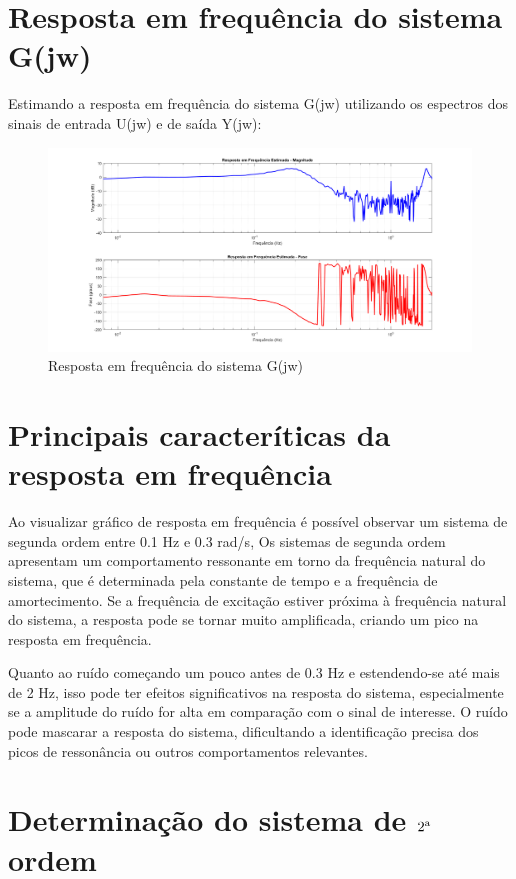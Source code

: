 \documentclass[10pt]{article}
\begin{document}
\section{Resposta em frequência do sistema G(jw)}

\quad Estimando a resposta em frequência do sistema G(jw) utilizando os espectros dos sinais
de entrada U(jw) e de saída Y(jw):

\begin{figure}[h]
    \centering
    \includegraphics[scale=0.34]{g.png}
    \caption{Resposta em frequência do sistema G(jw)}
\end{figure}

\section{Principais caracteríticas da resposta em frequência}

\quad Ao visualizar gráfico de resposta em frequência é possível observar um sistema de segunda ordem entre 0.1 Hz e 0.3 rad/s,
Os sistemas de segunda ordem apresentam um comportamento ressonante em torno da frequência natural do sistema,
que é determinada pela constante de tempo e a frequência de amortecimento.
Se a frequência de excitação estiver próxima à frequência natural do sistema,
a resposta pode se tornar muito amplificada, criando um pico na resposta em frequência.

\quad Quanto ao ruído começando um pouco antes de 0.3 Hz e estendendo-se até mais de 2 Hz,
isso pode ter efeitos significativos na resposta do sistema,
especialmente se a amplitude do ruído for alta em comparação com o sinal de interesse.
O ruído pode mascarar a resposta do sistema,
dificultando a identificação precisa dos picos de ressonância ou
outros comportamentos relevantes.

\newpage

\section{Determinação do sistema de $2\textsuperscript{a}$ ordem}
\end{document}
